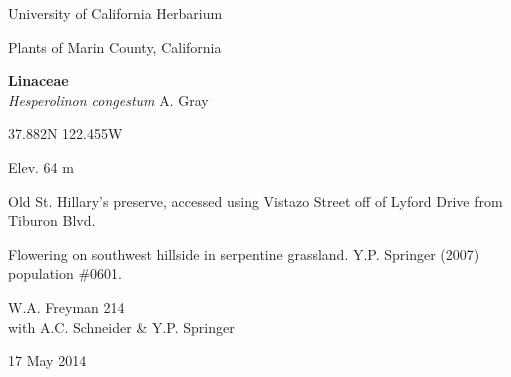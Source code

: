 \documentclass[letterpaper,10pt]{article}
\begin{document}

%
%

\begin{minipage}[t]{0.40\textwidth}

\begin{center}
University of California Herbarium \\
\begin{large}
Plants of Marin County, California \\
\end{large}
\vspace{\baselineskip}
\textbf{Linaceae} \\
\textit{Hesperolinon congestum} A. Gray\\
\end{center}

\begin{footnotesize}

\begin{multicols}{2}
37.882\textdegree N 122.455\textdegree W
\columnbreak
\begin{flushright}
Elev. 64 m
\end{flushright}
\end{multicols}

Old St. Hillary's preserve, accessed using Vistazo Street off of Lyford Drive from Tiburon Blvd.
\vspace{\baselineskip}

Flowering on southwest hillside in serpentine grassland. Y.P. Springer (2007) population \#0601.

\begin{multicols}{2}
W.A. Freyman 214 \\
with A.C. Schneider \& Y.P. Springer
\columnbreak
\begin{flushright}
17 May 2014
\end{flushright}
\end{multicols}

\end{footnotesize}

\end{minipage}
%
\hspace{2cm}
%
\end{document}
